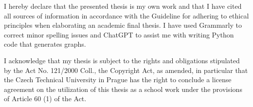 \documentclass[english,master,unicode]{ctufit-thesis}
\theoremstyle{plain}
\theoremstyle{definition}
\theoremstyle{remark}
\numberwithin{theorem}{chapter}
\begin{document}
    \begin{declarationpage}
        I hereby declare that the presented thesis is my own work and that I have cited all
        sources of information in accordance with the Guideline for adhering to ethical
        principles when elaborating an academic final thesis.
        I have used Grammarly to correct minor spelling issues and ChatGPT to assist me with writing Python code that generates graphs. 

        I acknowledge that my thesis is subject to the rights and obligations stipulated by the
        Act No. 121/2000 Coll., the Copyright Act, as amended, in particular that the Czech
        Technical University in Prague has the right to conclude a license agreement on the
        utilization of this thesis as a school work under the provisions of Article 60 (1) of the
        Act.
    \end{declarationpage}

    \printabstractpage %

%
%
%
%
%
%
%
%
%
\end{document}
